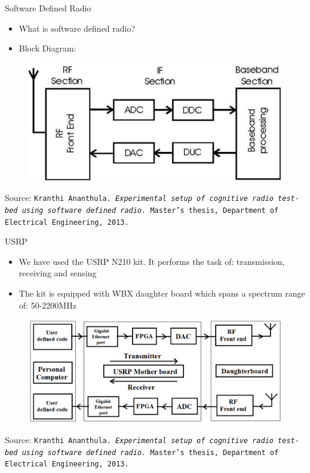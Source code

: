 \documentclass{beamer}
\begin{document}
  \begin{frame}{Software Defined Radio}
    \begin{minipage}[t][0.8\textheight][t]{\textwidth}
      \begin{itemize}
	\item What is software defined radio?
	\item Block Diagram:
      \end{itemize}
      \begin{figure}
	\centering
	\includegraphics[width=\linewidth]{img/sdrBlock}
      \end{figure}
      \vfill
      \tiny{Source: \texttt{Kranthi Ananthula. \emph{Experimental setup of cognitive radio test-bed using software
defined radio.} Master's thesis, Department of Electrical Engineering, 2013.}}
   \end{minipage}
  \end{frame}

  \begin{frame}{USRP}
    \begin{minipage}[t][0.8\textheight][t]{\textwidth}
      \begin{itemize}
	\item We have used the USRP N210 kit. It performs the task of: transmission, receiving and sensing
	\item The kit is equipped with WBX daughter board which spans a spectrum range of: 50-2200MHz
      \end{itemize}
      \begin{figure}
	\centering
	\includegraphics[width=\linewidth]{img/usrpBlock}
      \end{figure}
      \vfill
      \tiny{Source: \texttt{Kranthi Ananthula. \emph{Experimental setup of cognitive radio test-bed using software
defined radio.} Master's thesis, Department of Electrical Engineering, 2013.}}
   \end{minipage}
  \end{frame}
  
\end{document}
